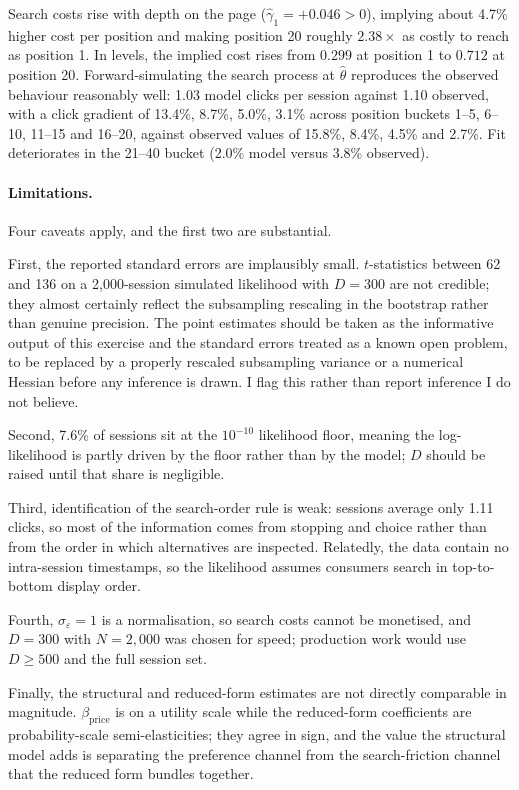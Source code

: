 \documentclass[11pt]{article}
\begin{document}
Search costs rise with depth on the page ($\hat\gamma_1 = +0.046 > 0$),
implying about 4.7\% higher cost per position and making position 20 roughly
$2.38\times$ as costly to reach as position 1. In levels, the implied cost
rises from $0.299$ at position 1 to $0.712$ at position 20. Forward-simulating
the search process at $\hat\theta$ reproduces the observed behaviour reasonably
well: 1.03 model clicks per session against 1.10 observed, with a click
gradient of 13.4\%, 8.7\%, 5.0\%, 3.1\% across position buckets 1--5, 6--10,
11--15 and 16--20, against observed values of 15.8\%, 8.4\%, 4.5\% and 2.7\%.
Fit deteriorates in the 21--40 bucket (2.0\% model versus 3.8\% observed).

\paragraph{Limitations.} Four caveats apply, and the first two are substantial.

First, the reported standard errors are implausibly small. $t$-statistics
between 62 and 136 on a 2,000-session simulated likelihood with $D = 300$ are
not credible; they almost certainly reflect the subsampling rescaling in the
bootstrap rather than genuine precision. The point estimates should be taken as
the informative output of this exercise and the standard errors treated as a
known open problem, to be replaced by a properly rescaled subsampling variance
or a numerical Hessian before any inference is drawn. I flag this rather than
report inference I do not believe.

Second, 7.6\% of sessions sit at the $10^{-10}$ likelihood floor, meaning the
log-likelihood is partly driven by the floor rather than by the model; $D$
should be raised until that share is negligible.

Third, identification of the search-order rule is weak: sessions average only
1.11 clicks, so most of the information comes from stopping and choice rather
than from the order in which alternatives are inspected. Relatedly, the data
contain no intra-session timestamps, so the likelihood assumes consumers search
in top-to-bottom display order.

Fourth, $\sigma_\varepsilon = 1$ is a normalisation, so search costs cannot be
monetised, and $D = 300$ with $N = 2{,}000$ was chosen for speed; production
work would use $D \geq 500$ and the full session set.

Finally, the structural and reduced-form estimates are not directly comparable
in magnitude. $\beta_{\text{price}}$ is on a utility scale while the reduced-form
coefficients are probability-scale semi-elasticities; they agree in sign, and
the value the structural model adds is separating the preference channel from
the search-friction channel that the reduced form bundles together.
\end{document}
